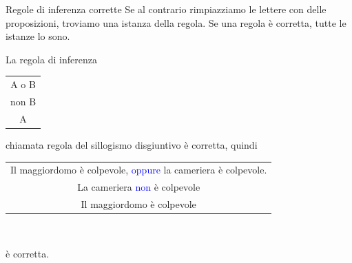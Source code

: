 \documentclass[aspectratio=169,10pt]{beamer}
\newcommand{\conn}[1]{\textcolor{blue}{#1}}
\newenvironment{inference}{\begin{tabular}{c}}{\end{tabular}}
\begin{document}
\begin{frame}{Regole di inferenza corrette}
	Se al contrario rimpiazziamo le lettere con delle proposizioni, troviamo una \alert{istanza} della regola.
    Se una regola è corretta, tutte le istanze lo sono.

    \begin{example}
        La regola di inferenza\\
            \begin{center}
        	\begin{inference}
            A o B\\
            non B\\
            \hline
            A
        \end{inference}
        \end{center}
        chiamata \alert{regola del sillogismo disgiuntivo} è corretta, quindi\\
        \begin{center}
        		\begin{inference}
            Il maggiordomo è colpevole, \conn{oppure} la cameriera è colpevole.\\
            La cameriera \conn{non} è colpevole\\
            \hline
            Il maggiordomo è colpevole
        \end{inference}\\
        \end{center}
        è corretta.
    \end{example}
\end{frame}
\end{document}
